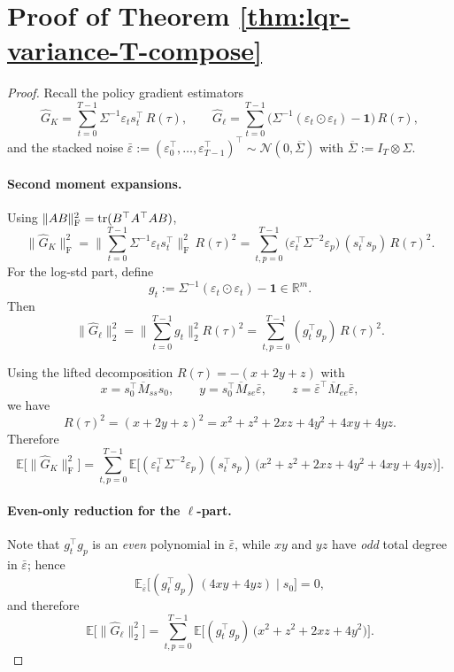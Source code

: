 \section{Proof of Theorem \ref{thm:lqr-variance-T-compose}}
\label{sec:app-proof-lqr-variance-T-compose}

\begin{proof}
Recall the policy gradient estimators
\[
\widehat G_K
=\sum_{t=0}^{T-1}\Sigma^{-1}\varepsilon_t s_t^\top\,R(\tau),
\qquad
\widehat G_{\ell}
=\sum_{t=0}^{T-1}\Big(\Sigma^{-1}(\varepsilon_t\odot \varepsilon_t)-\mathbf 1\Big)\,R(\tau),
\]
and the stacked noise $\bar\varepsilon:=(\varepsilon_0^\top,\dots,\varepsilon_{T-1}^\top)^\top\sim\mathcal N(0,\overline\Sigma)$
with $\overline\Sigma:=I_T\otimes\Sigma$.


\paragraph{Second moment expansions.}
Using $\|AB\|_{\mathrm{F}}^2=\operatorname{tr}(B^\top A^\top A B)$,
\[
\|\widehat G_K\|_{\mathrm{F}}^2
=\Big\|\sum_{t=0}^{T-1}\Sigma^{-1}\varepsilon_t s_t^\top\Big\|_{\mathrm{F}}^2\,R(\tau)^2
=\sum_{t,p=0}^{T-1}\big(\varepsilon_t^\top\Sigma^{-2}\varepsilon_p\big)\,(s_t^\top s_p)\,R(\tau)^2.
\]
For the log-std part, define
\[
g_t := \Sigma^{-1}(\varepsilon_t\odot \varepsilon_t)-\mathbf 1\in\mathbb R^m.
\]
Then
\[
\|\widehat G_{\ell}\|_2^2
=\Big\|\sum_{t=0}^{T-1} g_t\Big\|_2^2 R(\tau)^2
=\sum_{t,p=0}^{T-1}(g_t^\top g_p)\,R(\tau)^2.
\]

Using the lifted decomposition $R(\tau)=-(x+2y+z)$ with
\[
x=s_0^\top\overline M_{ss}s_0,\qquad
y=s_0^\top\overline M_{se}\bar\varepsilon,\qquad
z=\bar\varepsilon^\top\overline M_{ee}\bar\varepsilon,
\]
we have
\begin{equation}\label{eq:R2_expand_full}
R(\tau)^2=(x+2y+z)^2 = x^2+z^2+2xz+4y^2 + 4xy + 4yz .
\end{equation}
Therefore
\begin{equation}\label{eq:EGnorm_expand_tp}
\mathbb E\big[\|\widehat G_K\|_{\mathrm{F}}^2\big]
=\sum_{t,p=0}^{T-1}\mathbb E\Big[(\varepsilon_t^\top\Sigma^{-2}\varepsilon_p)(s_t^\top s_p)\,
\big(x^2+z^2+2xz+4y^2+4xy+4yz\big)\Big].
\end{equation}

\paragraph{Even-only reduction for the $\ell$-part.}
Note that $g_t^\top g_p$ is an \emph{even} polynomial in $\bar\varepsilon$, while $xy$ and $yz$ have \emph{odd} total
degree in $\bar\varepsilon$; hence
\[
\mathbb E_{\bar\varepsilon} \big[(g_t^\top g_p)\,(4xy+4yz)\mid s_0\big]=0,
\]
and therefore
\begin{equation}\label{eq:EGell_even_only}
\mathbb E\big[\|\widehat G_{\ell}\|_2^2\big]
=\sum_{t,p=0}^{T-1}\mathbb E\Big[(g_t^\top g_p)\,\big(x^2+z^2+2xz+4y^2\big)\Big].
\end{equation}


\end{proof}
